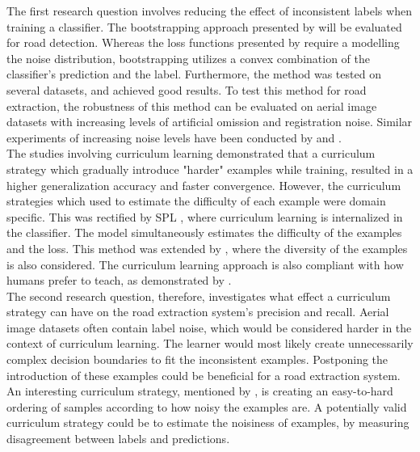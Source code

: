 The first research question involves reducing the effect of inconsistent labels when training a classifier. The bootstrapping approach presented by \cite{Reed_noisy_labels_bootstrapping} will be evaluated for road detection. Whereas the loss functions presented by \citep{Mnih_aerial_images_noisy} require a modelling the noise distribution,  bootstrapping utilizes a convex combination of the classifier's prediction and the label. Furthermore, the method was tested on several datasets, and achieved good results. To test this method for road extraction, the robustness of this method can be evaluated on aerial image datasets with increasing levels of artificial omission and registration noise. Similar experiments of increasing noise levels have been conducted by \citep{Sukhbaatar_noisy_network_learning} and \citep{Reed_noisy_labels_bootstrapping}.\\

The studies involving curriculum learning demonstrated that a curriculum strategy which gradually introduce "harder" examples while training, resulted in a higher generalization accuracy and faster convergence. However, the curriculum strategies which \cite{Bengio_curriculumlearning} used to estimate the difficulty of each example were domain specific. This was rectified by \ac{SPL} \citep{Kumar_self_paced_learning}, where curriculum learning is internalized in the classifier. The model simultaneously estimates the difficulty of the examples and the loss. This method was extended by \citep{Lu_self-paced_learning_diversity}, where the diversity of the examples is   also considered. The curriculum learning approach is also compliant with how humans prefer to teach, as demonstrated by \cite{Khan_human_teach}.\\

The second research question, therefore, investigates what effect a curriculum strategy can have on the road extraction system's precision and recall. Aerial image datasets often contain label noise, which would be considered harder in the context of curriculum learning. The learner would most likely create unnecessarily complex decision boundaries to fit the inconsistent examples. Postponing the introduction of these examples could be beneficial for a road extraction system. An interesting curriculum strategy, mentioned by \cite{Bengio_curriculumlearning}, is creating an easy-to-hard ordering of samples according to how noisy the examples are. A potentially valid curriculum strategy could be to estimate the noisiness of examples, by measuring disagreement between labels and predictions.\\